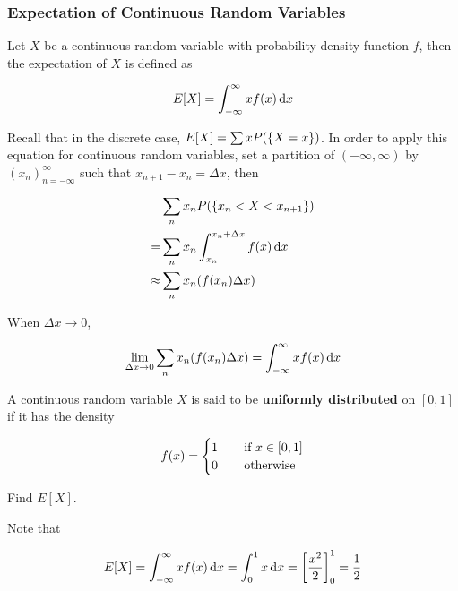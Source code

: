 \documentclass[a4paper,12pt]{article}
\begin{document}
\subsubsection{Expectation of Continuous Random Variables}
\begin{dft}
  Let $X$ be a continuous random variable with probability density function $f$, then the expectation of $X$ is defined as

  $$E[X]=\int_{-\infty}^{\infty}xf(x)\,\mathrm{d} x$$
\end{dft}\n

Recall that in the discrete case, $E[X]=\sum xP(\left\{ X=x\right\})$. In order to apply this equation for continuous random variables, set a partition of $(-\infty,\infty)$ by $(x_{n})_{n=-\infty}^{\infty}$ such that $x_{n+1}-x_{n}=\Delta x$, then

$$\begin{aligned}[t]
  &\sum_{n}x_{n}P(\left\{ x_{n}<X<x_{n+1}\right\})\\
  =&\sum_{n}x_{n}\int_{x_{n}}^{x_{n}+\Delta x}f(x)\,\mathrm{d} x\\
  \approx&\sum_{n}x_{n}(f(x_{n})\Delta x)
\end{aligned}$$\s

When $\Delta x\to 0$,

$$\lim_{\Delta x\to 0}\sum_{n}x_{n}(f(x_{n})\Delta x)=\int_{-\infty}^{\infty}xf(x)\,\mathrm{d} x$$\s

\begin{exm}
  A continuous random variable $X$ is said to be \textbf{uniformly distributed} on $[0,1]$ if it has the density

  $$f(x)=\begin{cases}
    1&\;\;\;\;\text{if }x\in[0,1]\\
    0&\;\;\;\;\text{otherwise}
  \end{cases}$$\s

  Find $E[X]$.\n

  \ans Note that

  $$E[X]=\int_{-\infty}^{\infty}xf(x)\,\mathrm{d} x=\int_{0}^{1}x\,\mathrm{d} x=\left[ \frac{x^{2}}{2}\right]_{0}^{1}=\frac{1}{2}$$
\end{exm}\n
\end{document}
